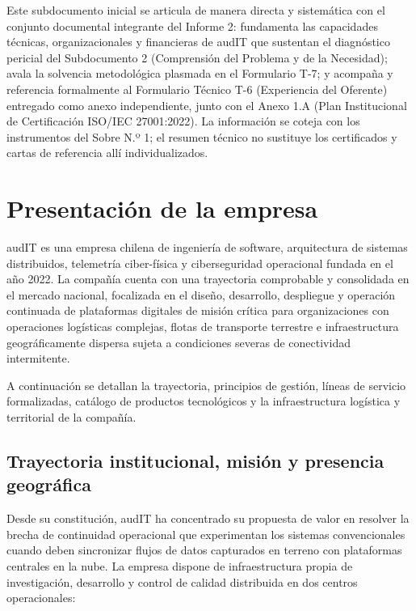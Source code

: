 Este subdocumento inicial se articula de manera directa y sistemática con el conjunto documental integrante del Informe 2: fundamenta las capacidades técnicas, organizacionales y financieras de audIT que sustentan el diagnóstico pericial del Subdocumento 2 (Comprensión del Problema y de la Necesidad); avala la solvencia metodológica plasmada en el Formulario T-7; y acompaña y referencia formalmente al Formulario Técnico T-6 (Experiencia del Oferente) entregado como anexo independiente, junto con el Anexo 1.A (Plan Institucional de Certificación ISO/IEC 27001:2022). La información se coteja con los instrumentos del Sobre N.º 1; el resumen técnico no sustituye los certificados y cartas de referencia allí individualizados.

\section{Presentación de la empresa}\label{sec:1-presentacion}

audIT es una empresa chilena de ingeniería de software, arquitectura de sistemas distribuidos, telemetría ciber-física y ciberseguridad operacional fundada en el año 2022. La compañía cuenta con una trayectoria comprobable y consolidada en el mercado nacional, focalizada en el diseño, desarrollo, despliegue y operación continuada de plataformas digitales de misión crítica para organizaciones con operaciones logísticas complejas, flotas de transporte terrestre e infraestructura geográficamente dispersa sujeta a condiciones severas de conectividad intermitente.

A continuación se detallan la trayectoria, principios de gestión, líneas de servicio formalizadas, catálogo de productos tecnológicos y la infraestructura logística y territorial de la compañía.

\subsection{Trayectoria institucional, misión y presencia geográfica}\label{sec:1-trayectoria}

Desde su constitución, audIT ha concentrado su propuesta de valor en resolver la brecha de continuidad operacional que experimentan los sistemas convencionales cuando deben sincronizar flujos de datos capturados en terreno con plataformas centrales en la nube. La empresa dispone de infraestructura propia de investigación, desarrollo y control de calidad distribuida en dos centros operacionales:

